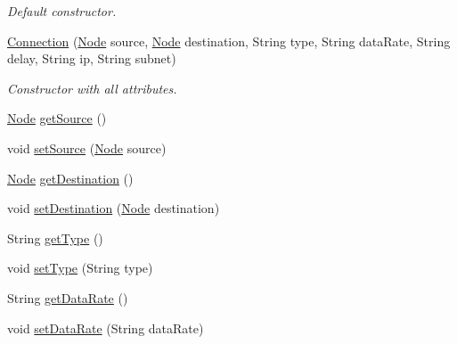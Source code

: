 \begin{DoxyCompactItemize}
\begin{DoxyCompactList}\small\item\em Default constructor. \end{DoxyCompactList}\item 
\hyperlink{classde_1_1hsbremen_1_1siprenz_1_1model_1_1xml_1_1Connection_a4ce0b9a5a1d9e20078bff797671eabe5}{Connection} (\hyperlink{classde_1_1hsbremen_1_1siprenz_1_1model_1_1xml_1_1Node}{Node} source, \hyperlink{classde_1_1hsbremen_1_1siprenz_1_1model_1_1xml_1_1Node}{Node} destination, String type, String data\+Rate, String delay, String ip, String subnet)
\begin{DoxyCompactList}\small\item\em Constructor with all attributes. \end{DoxyCompactList}\item 
\hyperlink{classde_1_1hsbremen_1_1siprenz_1_1model_1_1xml_1_1Node}{Node} \hyperlink{classde_1_1hsbremen_1_1siprenz_1_1model_1_1xml_1_1Connection_a406342644ccdbd291fbfe5500a019b4a}{get\+Source} ()
\item 
void \hyperlink{classde_1_1hsbremen_1_1siprenz_1_1model_1_1xml_1_1Connection_a6c7004b65a1f965aff92ebc0dc968d0f}{set\+Source} (\hyperlink{classde_1_1hsbremen_1_1siprenz_1_1model_1_1xml_1_1Node}{Node} source)
\item 
\hyperlink{classde_1_1hsbremen_1_1siprenz_1_1model_1_1xml_1_1Node}{Node} \hyperlink{classde_1_1hsbremen_1_1siprenz_1_1model_1_1xml_1_1Connection_a5373ca2592ef4594fccf0997c0788374}{get\+Destination} ()
\item 
void \hyperlink{classde_1_1hsbremen_1_1siprenz_1_1model_1_1xml_1_1Connection_a21ca377ff86403f392263222f71fce74}{set\+Destination} (\hyperlink{classde_1_1hsbremen_1_1siprenz_1_1model_1_1xml_1_1Node}{Node} destination)
\item 
String \hyperlink{classde_1_1hsbremen_1_1siprenz_1_1model_1_1xml_1_1Connection_aded733298efa107776870518d1e1f62b}{get\+Type} ()
\item 
void \hyperlink{classde_1_1hsbremen_1_1siprenz_1_1model_1_1xml_1_1Connection_afe77af3528d52913b64300ca19a8cc89}{set\+Type} (String type)
\item 
String \hyperlink{classde_1_1hsbremen_1_1siprenz_1_1model_1_1xml_1_1Connection_ae9f65d4e866d7fefc3abb04f6509339c}{get\+Data\+Rate} ()
\item 
void \hyperlink{classde_1_1hsbremen_1_1siprenz_1_1model_1_1xml_1_1Connection_ae03544a676a56ecce7096cc1289ddc98}{set\+Data\+Rate} (String data\+Rate)
\item 

\end{DoxyCompactItemize}

